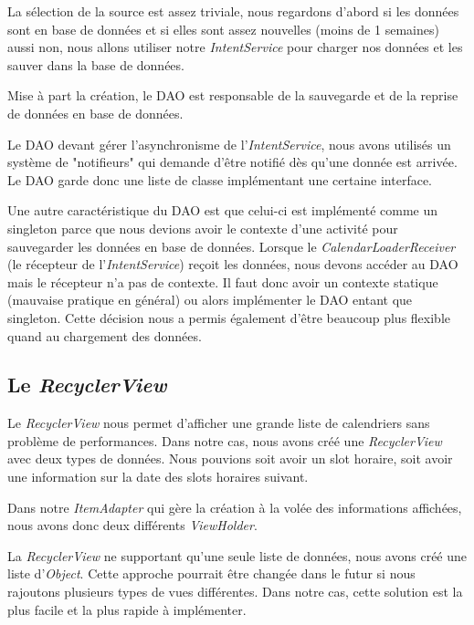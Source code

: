 \documentclass{article}
\begin{document}
            La sélection de la source est assez triviale, nous regardons d'abord si les données sont
            en base de données et si elles sont assez nouvelles (moins de 1 semaines) aussi non,
            nous allons utiliser notre \textit{IntentService} pour charger nos données et les sauver
            dans la base de données.

            Mise à part la création, le DAO est responsable de la sauvegarde et de la reprise de
            données en base de données.

            Le DAO devant gérer l'asynchronisme de l'\textit{IntentService}, nous avons utilisés un
            système de "notifieurs" qui demande d'être notifié dès qu'une donnée est arrivée. Le DAO
            garde donc une liste de classe implémentant une certaine interface.

            Une autre caractéristique du DAO est que celui-ci est implémenté comme un singleton
            parce que nous devions avoir le contexte d'une activité pour sauvegarder les données en
            base de données. Lorsque le \textit{CalendarLoaderReceiver} (le récepteur de
            l'\textit{IntentService}) reçoit les données, nous devons accéder au DAO mais le
            récepteur n'a pas de contexte. Il faut donc avoir un contexte statique (mauvaise pratique
            en général) ou alors implémenter le DAO entant que singleton. Cette décision nous a
            permis également d'être beaucoup plus flexible quand au chargement des données.

        \subsection{Le \textit{RecyclerView}}
            Le \textit{RecyclerView} nous permet d'afficher une grande liste de calendriers sans
            problème de performances. Dans notre cas, nous avons créé une \textit{RecyclerView}
            avec deux types de données. Nous pouvions soit avoir un slot horaire, soit avoir une
            information sur la date des slots horaires suivant.

            Dans notre \textit{ItemAdapter} qui gère la création à la volée des informations
            affichées, nous avons donc deux différents \textit{ViewHolder}.

            La \textit{RecyclerView} ne supportant qu'une seule liste de données, nous avons créé
            une liste d'\textit{Object}. Cette approche pourrait être changée dans le futur si nous
            rajoutons plusieurs types de vues différentes. Dans notre cas, cette solution est la
            plus facile et la plus rapide à implémenter.
	
\end{document}

